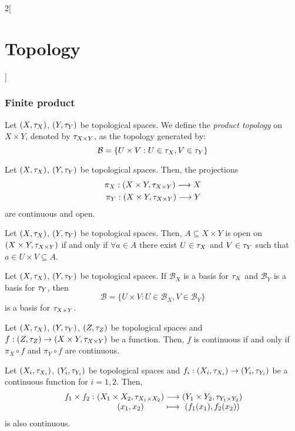 \documentclass[../../../main.tex]{subfiles}
\begin{document}
\begin{multicols}{2}[\section{Topology}]
  \subsubsection{Finite product}
  \begin{definition}
    Let $(X,\tau_X)$, $(Y,\tau_Y)$ be topological spaces. We define the \textit{product topology} on $X\times Y$, denoted by $\tau_{X\times Y}$, as the topology generated by: $$\mathcal{B}=\{U\times V:U\in\tau_X,V\in\tau_Y\}$$
  \end{definition}
  \begin{prop}
    Let $(X,\tau_X)$, $(Y,\tau_Y)$ be topological spaces. Then, the projections
    \begin{align*}
      \pi_X:(X\times Y,\tau_{X\times Y})\longrightarrow X \\
      \pi_Y:(X\times Y,\tau_{X\times Y})\longrightarrow Y
    \end{align*}
    are continuous and open.
  \end{prop}
  \begin{prop}
    Let $(X,\tau_X)$, $(Y,\tau_Y)$ be topological spaces. Then, $A\subseteq X\times Y$ is open on $(X\times Y,\tau_{X\times Y})$ if and only if $\forall a\in A$ there exist $U\in\tau_X$ and $V\in\tau_Y$ such that $a\in U\times V\subseteq A$.
  \end{prop}
  \begin{prop}
    Let $(X,\tau_X)$, $(Y,\tau_Y)$ be topological spaces. If $\mathcal{B}_X$ is a basis for $\tau_X$ and $\mathcal{B}_Y$ is a basis for $\tau_Y$, then $$\mathcal{B}=\{U\times V:U\in\mathcal{B}_X,V\in\mathcal{B}_Y\}$$
    is a basis for $\tau_{X\times Y}$.
  \end{prop}
  \begin{prop}
    Let $(X,\tau_X)$, $(Y,\tau_Y)$, $(Z,\tau_Z)$ be topological spaces and $f:(Z,\tau_Z)\rightarrow(X\times Y,\tau_{X\times Y})$ be a function. Then, $f$ is continuous if and only if $\pi_X\circ f$ and $\pi_Y\circ f$ are continuous.
  \end{prop}
  \begin{prop}
    Let $(X_i,\tau_{X_i})$, $(Y_i,\tau_{Y_i})$ be topological spaces and $f_i:(X_i,\tau_{X_i})\rightarrow(Y_i,\tau_{Y_i})$ be a continuous function for $i=1,2$. Then,
    $$
      \function{f_1\times f_2}{(X_1\times X_2,\topo_{X_1\times X_2})}{(Y_1\times Y_2,\topo_{Y_1\times Y_2})}{(x_1,x_2)}{(f_1(x_1),f_2(x_2))}
    $$ is also continuous.
  \end{prop}
  \begin{prop}

\end{prop}
\end{multicols}
\end{document}
